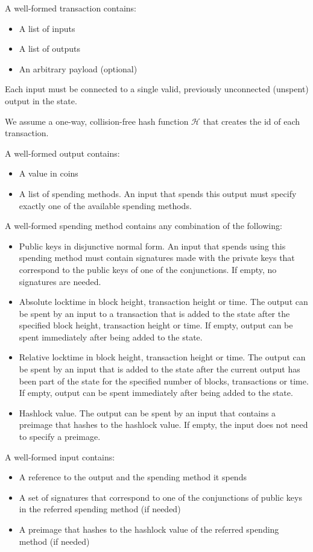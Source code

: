A well-formed transaction contains:
\begin{itemize}
  \item A list of inputs
  \item A list of outputs
  \item An arbitrary payload (optional)
\end{itemize}
Each input must be connected to a single valid, previously unconnected (unspent)
output in the state.

We assume a one-way, collision-free hash function $\mathcal{H}$ that creates the
id of each transaction.

A well-formed output contains:
\begin{itemize}
  \item A value in coins
  \item A list of spending methods. An input that spends this output must
  specify exactly one of the available spending methods.
\end{itemize}

A well-formed spending method contains any combination of the following:
\begin{itemize}
  \item Public keys in disjunctive normal form. An input that spends using this
  spending method must contain signatures made with the private keys that
  correspond to the public keys of one of the conjunctions. If empty, no
  signatures are needed.
  \item Absolute locktime in block height, transaction height or time. The
  output can be spent by an input to a transaction that is added to the state
  after the specified block height, transaction height or time. If empty, output
  can be spent immediately after being added to the state.
  \item Relative locktime in block height, transaction height or time. The
  output can be spent by an input that is added to the state after the current
  output has been part of the state for the specified number of blocks,
  transactions or time. If empty, output can be spent immediately after being
  added to the state.
  \item Hashlock value. The output can be spent by an input that contains a
  preimage that hashes to the hashlock value. If empty, the input does not need
  to specify a preimage.
\end{itemize}

A well-formed input contains:
\begin{itemize}
  \item A reference to the output and the spending method it spends
  \item A set of signatures that correspond to one of the conjunctions of public
  keys in the referred spending method (if needed)
  \item A preimage that hashes to the hashlock value of the referred spending
  method (if needed)
\end{itemize}

